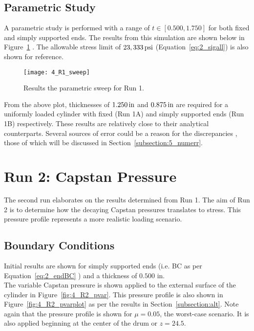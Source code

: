 \subsection{Parametric Study}

A parametric study is performed with a range of $t \in [0.500, 1.750]$ for both fixed and simply supported ends. The results from this simulation are shown below in Figure~\ref{fig:4_R1_sweep} \cite{EXCEL}. The allowable stress limit of $23,333 \,\mathrm{psi}$ (Equation~\ref{eq:2_sigall}) is also shown for reference.

\begin{figure}[H]
	\centering
	\texttt{[image: 4\_R1\_sweep]}
	\caption{Results the parametric sweep for Run 1.}
	\label{fig:4_R1_sweep}
\end{figure}

From the above plot, thicknesses of $1.250 \,\mathrm{in}$ and $0.875\,\mathrm{in}$ are required for a uniformly loaded cylinder with fixed (Run 1A) and simply supported ends (Run 1B) respectively. These results are relatively close to their analytical counterparts. Several sources of error could be a reason for the discrepancies , those of which will be discussed in Section~\ref{subsection:5_numerr}.

\section{Run 2: Capstan Pressure}
\label{section:4_R2}
The second run elaborates on the results determined from Run 1. The aim of Run 2 is to determine how the decaying Capstan pressures translates to stress. This pressure profile represents a more realistic loading scenario.

\subsection{Boundary Conditions}

Initial results are shown for simply supported ends (i.e. BC as per Equation~\ref{eq:2_endBC} ) and a thickness of $0.500$ in.\\

The variable Capstan pressure is shown applied to the external surface of the cylinder in Figure~\ref{fig:4_R2_pvar}. This pressure profile is also shown in Figure~\ref{fig:4_R2_pvarplot} as per the results in Section~\ref{subsection:alt}. Note again that the pressure profile is shown for $\mu=0.05$, the worst-case scenario. It is also applied beginning at the center of the drum or $z=24.5$.


